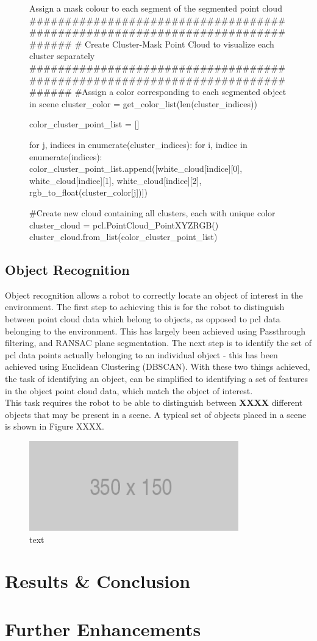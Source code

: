 \documentclass[a4paper]{article}
\begin{document}
\begin{figure}[h]\scriptsize
\begin{sexylisting}{Assign a mask colour to each segment of the segmented point cloud}
##############################################################################
    # Create Cluster-Mask Point Cloud to visualize each cluster separately
##############################################################################
    #Assign a color corresponding to each segmented object in scene
    cluster_color = get_color_list(len(cluster_indices))

    color_cluster_point_list = []

    for j, indices in enumerate(cluster_indices):
        for i, indice in enumerate(indices):
            color_cluster_point_list.append([white_cloud[indice][0],
                                            white_cloud[indice][1],
                                            white_cloud[indice][2],
                                            rgb_to_float(cluster_color[j])])

    #Create new cloud containing all clusters, each with unique color
    cluster_cloud = pcl.PointCloud_PointXYZRGB()
    cluster_cloud.from_list(color_cluster_point_list)
\end{sexylisting}
\end{figure}

\subsection{Object Recognition}
Object recognition allows a robot to correctly locate an object of interest in the environment. The first step to achieving this is for the robot to distinguish between point cloud data which belong to objects, as opposed to pcl data belonging to the environment. This has largely been achieved using Passthrough filtering, and RANSAC plane segmentation. The next step is to identify the set of pcl data points actually belonging to an individual object - this has been achieved using Euclidean Clustering (DBSCAN). With these two things achieved, the task of identifying an object, can be simplified to identifying a set of features in the object point cloud data, which  match the object of interest.\\

This task requires the robot to be able to distinguish between \textbf{XXXX} different objects that may be present in a scene. A typical set of objects placed in a scene is shown in Figure XXXX.
\begin{figure}
\centering
\includegraphics[scale=0.5]{placeholder}
\caption{text}
\end{figure}
\section{Results \& Conclusion}

\section{Further Enhancements}
\end{document}
